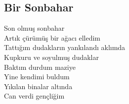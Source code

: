 \subsection{Bir Sonbahar}

Son olmuş sonbahar \\
Artık çürümüş bir ağacı elledim \\
Tattığım dudakların yankılandı aklımda \\
Kupkuru ve soyulmuş dudaklar \\

\noindent\newline
Baktım durdum maziye \\
Yine kendimi buldum \\
Yıkılan binalar altında \\
Can verdi gençliğim \\